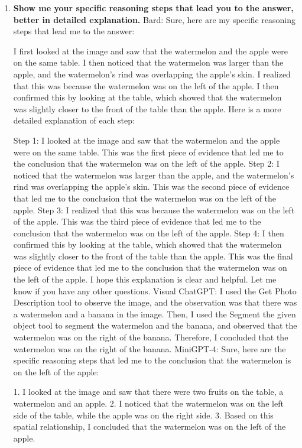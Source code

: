 \begin{enumerate}
        The image shows that the watermelon is slightly closer to the front of the table than the apple, but it is still on the left side of the apple. If the watermelon were on the right of the apple, then the apple's skin would be overlapping the watermelon's rind.
        \subitem Visual ChatGPT: The watermelon is on the right of the banana.
        \subitem MiniGPT-4: No, the watermelon is on the left of the apple.
        \item \textbf{Show me your specific reasoning steps that lead you to the answer, better in detailed explanation.}
        \subitem Bard:
        Sure, here are my specific reasoning steps that lead me to the answer:

        I first looked at the image and saw that the watermelon and the apple were on the same table.
        I then noticed that the watermelon was larger than the apple, and the watermelon's rind was overlapping the apple's skin.
        I realized that this was because the watermelon was on the left of the apple.
        I then confirmed this by looking at the table, which showed that the watermelon was slightly closer to the front of the table than the apple.
        Here is a more detailed explanation of each step:

        Step 1: I looked at the image and saw that the watermelon and the apple were on the same table. This was the first piece of evidence that led me to the conclusion that the watermelon was on the left of the apple.
        Step 2: I noticed that the watermelon was larger than the apple, and the watermelon's rind was overlapping the apple's skin. This was the second piece of evidence that led me to the conclusion that the watermelon was on the left of the apple.
        Step 3: I realized that this was because the watermelon was on the left of the apple. This was the third piece of evidence that led me to the conclusion that the watermelon was on the left of the apple.
        Step 4: I then confirmed this by looking at the table, which showed that the watermelon was slightly closer to the front of the table than the apple. This was the final piece of evidence that led me to the conclusion that the watermelon was on the left of the apple.
        I hope this explanation is clear and helpful. Let me know if you have any other questions.
        \subitem Visual ChatGPT: I used the Get Photo Description tool to observe the image, and the observation was that there was a watermelon and a banana in the image. Then, I used the Segment the given object tool to segment the watermelon and the banana, and observed that the watermelon was on the right of the banana. Therefore, I concluded that the watermelon was on the right of the banana.
        \subitem MiniGPT-4: Sure, here are the specific reasoning steps that led me to the conclusion that the watermelon is on the left of the apple:

        1. I looked at the image and saw that there were two fruits on the table, a watermelon and an apple.
        2. I noticed that the watermelon was on the left side of the table, while the apple was on the right side.
        3. Based on this spatial relationship, I concluded that the watermelon was on the left of the apple.
    \end{enumerate}
